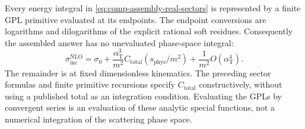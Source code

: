 Every energy integral in \eqref{eq:comp-assembly-real-sectors}
is represented by a finite GPL primitive evaluated at its endpoints.
The endpoint conversions are logarithms and dilogarithms of the
explicit rational soft residues. Consequently the assembled answer
has no unevaluated phase-space integral:
\begin{equation}
 \boxed{\sigma_{\mathrm{inc}}^{\mathrm{NLO}}
 =\sigma_0+\frac{\alpha_{\mathrm T}^3}{m^2}
 C_{\mathrm{total}}(s_{\mathrm{phys}}/m^2)
 +\frac1{m^2}O(\alpha_{\mathrm T}^4).}
 \label{eq:comp-assembly-sigma}
\end{equation}
The remainder is at fixed dimensionless kinematics. The preceding
sector formulas and finite primitive recursions specify
$C_{\mathrm{total}}$ constructively, without using a published total
as an integration condition. Evaluating the GPLs by convergent
series is an evaluation of these analytic special functions, not
a numerical integration of the scattering phase space.
